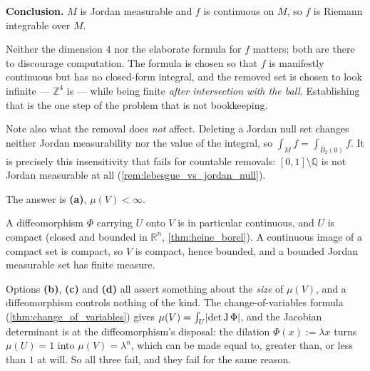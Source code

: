 \begin{exercisesolution}
\textbf{Conclusion.} $M$ is Jordan measurable and $f$ is continuous on $\overline M$, so $f$ is
Riemann integrable over $M$.
\begin{remark}
Neither the dimension $4$ nor the elaborate formula for $f$ matters; both are there to discourage
computation. The formula is chosen so that $f$ is manifestly continuous but has no closed-form
integral, and the removed set is chosen to look infinite --- $\mathbb{Z}^4$ is --- while being
finite \emph{after intersection with the ball}. Establishing that is the one step of the problem
that is not bookkeeping.

Note also what the removal does \emph{not} affect. Deleting a Jordan null set changes neither
Jordan measurability nor the value of the integral, so
$\int_M f = \int_{\overline{B}_2(0)} f$. It is precisely this insensitivity that fails for
countable removals: $[0,1]\setminus\mathbb{Q}$ is not Jordan measurable at all
(\cref{rem:lebesgue_vs_jordan_null}).
\end{remark}
\end{exercisesolution}

\begin{exercisesolution}
\label{sol:kobel_diffeomorphic_jordan_measure}
The answer is \textbf{(a)}, $\mu(V) < \infty$.

A diffeomorphism $\Phi$ carrying $U$ onto $V$ is in particular continuous, and $U$ is compact
(closed and bounded in $\mathbb{R}^n$, \cref{thm:heine_borel}). A continuous image of a compact set
is compact, so $V$ is compact, hence bounded, and a bounded Jordan measurable set has finite
measure.

Options \textbf{(b)}, \textbf{(c)} and \textbf{(d)} all assert something about the \emph{size} of
$\mu(V)$, and a diffeomorphism controls nothing of the kind. The change-of-variables formula
(\cref{thm:change_of_variables}) gives
$\mu(V) = \int_U \lvert\det \operatorname{J}\Phi\rvert$, and the Jacobian determinant is at the diffeomorphism's
disposal: the dilation $\Phi(x) := \lambda x$ turns $\mu(U)=1$ into $\mu(V) = \lambda^n$, which can
be made equal to, greater than, or less than $1$ at will. So all three fail, and they fail for the
same reason.
\end{exercisesolution}

